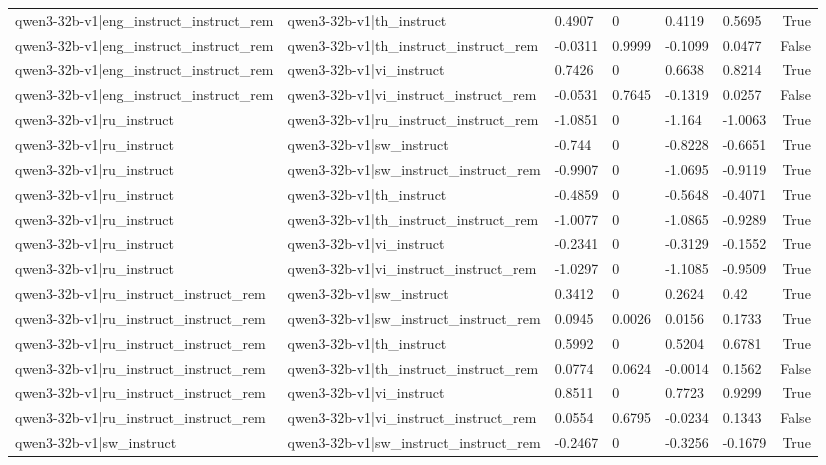 \begin{table}
\begin{tabular}{llllllr}
qwen3-32b-v1|eng_instruct_instruct_rem & qwen3-32b-v1|th_instruct & 0.4907 & 0 & 0.4119 & 0.5695 & True \\
qwen3-32b-v1|eng_instruct_instruct_rem & qwen3-32b-v1|th_instruct_instruct_rem & -0.0311 & 0.9999 & -0.1099 & 0.0477 & False \\
qwen3-32b-v1|eng_instruct_instruct_rem & qwen3-32b-v1|vi_instruct & 0.7426 & 0 & 0.6638 & 0.8214 & True \\
qwen3-32b-v1|eng_instruct_instruct_rem & qwen3-32b-v1|vi_instruct_instruct_rem & -0.0531 & 0.7645 & -0.1319 & 0.0257 & False \\
qwen3-32b-v1|ru_instruct & qwen3-32b-v1|ru_instruct_instruct_rem & -1.0851 & 0 & -1.164 & -1.0063 & True \\
qwen3-32b-v1|ru_instruct & qwen3-32b-v1|sw_instruct & -0.744 & 0 & -0.8228 & -0.6651 & True \\
qwen3-32b-v1|ru_instruct & qwen3-32b-v1|sw_instruct_instruct_rem & -0.9907 & 0 & -1.0695 & -0.9119 & True \\
qwen3-32b-v1|ru_instruct & qwen3-32b-v1|th_instruct & -0.4859 & 0 & -0.5648 & -0.4071 & True \\
qwen3-32b-v1|ru_instruct & qwen3-32b-v1|th_instruct_instruct_rem & -1.0077 & 0 & -1.0865 & -0.9289 & True \\
qwen3-32b-v1|ru_instruct & qwen3-32b-v1|vi_instruct & -0.2341 & 0 & -0.3129 & -0.1552 & True \\
qwen3-32b-v1|ru_instruct & qwen3-32b-v1|vi_instruct_instruct_rem & -1.0297 & 0 & -1.1085 & -0.9509 & True \\
qwen3-32b-v1|ru_instruct_instruct_rem & qwen3-32b-v1|sw_instruct & 0.3412 & 0 & 0.2624 & 0.42 & True \\
qwen3-32b-v1|ru_instruct_instruct_rem & qwen3-32b-v1|sw_instruct_instruct_rem & 0.0945 & 0.0026 & 0.0156 & 0.1733 & True \\
qwen3-32b-v1|ru_instruct_instruct_rem & qwen3-32b-v1|th_instruct & 0.5992 & 0 & 0.5204 & 0.6781 & True \\
qwen3-32b-v1|ru_instruct_instruct_rem & qwen3-32b-v1|th_instruct_instruct_rem & 0.0774 & 0.0624 & -0.0014 & 0.1562 & False \\
qwen3-32b-v1|ru_instruct_instruct_rem & qwen3-32b-v1|vi_instruct & 0.8511 & 0 & 0.7723 & 0.9299 & True \\
qwen3-32b-v1|ru_instruct_instruct_rem & qwen3-32b-v1|vi_instruct_instruct_rem & 0.0554 & 0.6795 & -0.0234 & 0.1343 & False \\
qwen3-32b-v1|sw_instruct & qwen3-32b-v1|sw_instruct_instruct_rem & -0.2467 & 0 & -0.3256 & -0.1679 & True \\

\end{tabular}
\end{table}
